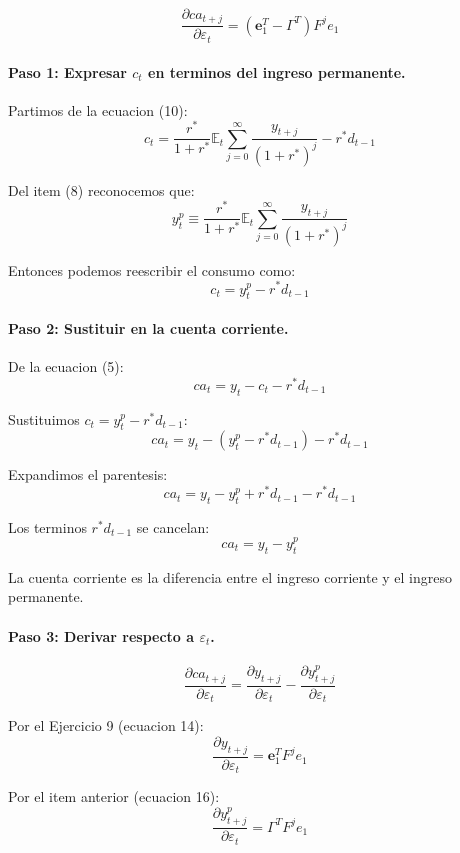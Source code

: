 \begin{enunciado}
\[
    \frac{\partial ca_{t+j}}{\partial \varepsilon_t} = (\mathbf{e}_1^T - \Gamma^T) F^j e_1
\]
\end{enunciado}

\paragraph{Paso 1: Expresar $c_t$ en terminos del ingreso permanente.}

Partimos de la ecuacion (10):
\[
    c_t = \frac{r^*}{1+r^*} \mathbb{E}_t \sum_{j=0}^{\infty} \frac{y_{t+j}}{(1+r^*)^j} - r^* d_{t-1}
\]

Del item (8) reconocemos que:
\[
    y_t^p \equiv \frac{r^*}{1+r^*} \mathbb{E}_t \sum_{j=0}^{\infty} \frac{y_{t+j}}{(1+r^*)^j}
\]

Entonces podemos reescribir el consumo como:
\[
    c_t = y_t^p - r^* d_{t-1}
\]

\paragraph{Paso 2: Sustituir en la cuenta corriente.}

De la ecuacion (5):
\[
    ca_t = y_t - c_t - r^* d_{t-1}
\]

Sustituimos $c_t = y_t^p - r^* d_{t-1}$:
\[
    ca_t = y_t - (y_t^p - r^* d_{t-1}) - r^* d_{t-1}
\]

Expandimos el parentesis:
\[
    ca_t = y_t - y_t^p + r^* d_{t-1} - r^* d_{t-1}
\]

Los terminos $r^* d_{t-1}$ se cancelan:
\[
    \boxed{ca_t = y_t - y_t^p}
\]

La cuenta corriente es la diferencia entre el ingreso corriente y el ingreso permanente.

\paragraph{Paso 3: Derivar respecto a $\varepsilon_t$.}

\[
    \frac{\partial ca_{t+j}}{\partial \varepsilon_t}
    = \frac{\partial y_{t+j}}{\partial \varepsilon_t} - \frac{\partial y_{t+j}^p}{\partial \varepsilon_t}
\]

Por el Ejercicio 9 (ecuacion 14):
\[
    \frac{\partial y_{t+j}}{\partial \varepsilon_t} = \mathbf{e}_1^T F^j e_1
\]

Por el item anterior (ecuacion 16):
\[
    \frac{\partial y_{t+j}^p}{\partial \varepsilon_t} = \Gamma^T F^j e_1
\]


